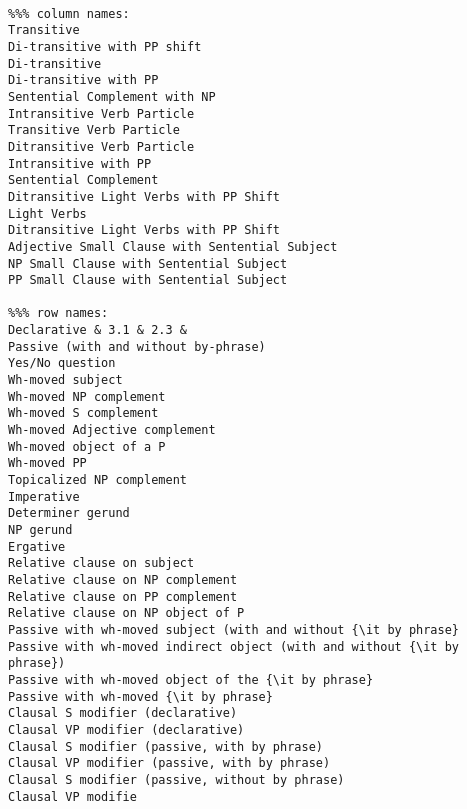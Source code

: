 \begin{verbatim}

%%% column names:
Transitive
Di-transitive with PP shift
Di-transitive
Di-transitive with PP
Sentential Complement with NP
Intransitive Verb Particle
Transitive Verb Particle
Ditransitive Verb Particle
Intransitive with PP
Sentential Complement
Ditransitive Light Verbs with PP Shift
Light Verbs
Ditransitive Light Verbs with PP Shift
Adjective Small Clause with Sentential Subject
NP Small Clause with Sentential Subject
PP Small Clause with Sentential Subject

%%% row names:
Declarative & 3.1 & 2.3 & 
Passive (with and without by-phrase) 
Yes/No question 
Wh-moved subject 
Wh-moved NP complement 
Wh-moved S complement 
Wh-moved Adjective complement 
Wh-moved object of a P 
Wh-moved PP 
Topicalized NP complement 
Imperative 
Determiner gerund 
NP gerund 
Ergative 
Relative clause on subject 
Relative clause on NP complement 
Relative clause on PP complement 
Relative clause on NP object of P 
Passive with wh-moved subject (with and without {\it by phrase} 
Passive with wh-moved indirect object (with and without {\it by phrase}) 
Passive with wh-moved object of the {\it by phrase} 
Passive with wh-moved {\it by phrase} 
Clausal S modifier (declarative) 
Clausal VP modifier (declarative) 
Clausal S modifier (passive, with by phrase) 
Clausal VP modifier (passive, with by phrase) 
Clausal S modifier (passive, without by phrase) 
Clausal VP modifie
\end{verbatim}




